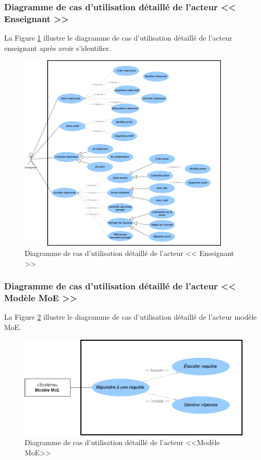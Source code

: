 \subsubsection{Diagramme de cas d’utilisation détaillé de l’acteur << Enseignant >>}
La Figure \ref{fig:diagramme de cas d’utilisation détaillé de l’acteur << Enseignant >>} illustre le diagramme de cas d’utilisation détaillé de l’acteur enseignant après avoir s’identifier.
\begin{figure}[H]
    \centering
    \includegraphics[width=0.9\textwidth,height=0.8\textheight]{images/chp3/fig4.png}
    \caption{Diagramme de cas d’utilisation détaillé de l’acteur << Enseignant >>}
    \label{fig:diagramme de cas d’utilisation détaillé de l’acteur << Enseignant >>}    
\end{figure}


\subsubsection{ Diagramme de cas d’utilisation détaillé de l’acteur << Modèle MoE >>}
La Figure \ref{fig: Diagramme de cas d’utilisation détaillé de l’acteur <<Modèle MoE>>>} illustre le diagramme de cas d’utilisation détaillé de l’acteur modèle MoE.

\begin{figure}[H]
    \centering
    \includegraphics[width=\textwidth,height=0.3\textheight]{images/chp3/fig5.png}
    \caption{Diagramme de cas d’utilisation détaillé de l’acteur <<Modèle MoE>>}
    \label{fig: Diagramme de cas d’utilisation détaillé de l’acteur <<Modèle MoE>>>}    
\end{figure}

